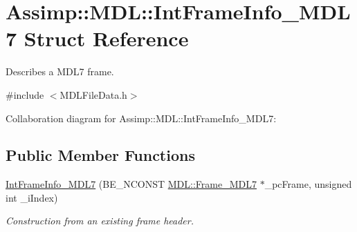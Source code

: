 \hypertarget{struct_assimp_1_1_m_d_l_1_1_int_frame_info___m_d_l7}{\section{Assimp\+:\+:M\+D\+L\+:\+:Int\+Frame\+Info\+\_\+\+M\+D\+L7 Struct Reference}
\label{struct_assimp_1_1_m_d_l_1_1_int_frame_info___m_d_l7}
}


Describes a M\+D\+L7 frame.  




{\ttfamily \#include $<$M\+D\+L\+File\+Data.\+h$>$}



Collaboration diagram for Assimp\+:\+:M\+D\+L\+:\+:Int\+Frame\+Info\+\_\+\+M\+D\+L7\+:
\subsection*{Public Member Functions}
\begin{DoxyCompactItemize}
\item 
\hypertarget{struct_assimp_1_1_m_d_l_1_1_int_frame_info___m_d_l7_a5e0211dcb0ba277f914e74333517ecfe}{\hyperlink{struct_assimp_1_1_m_d_l_1_1_int_frame_info___m_d_l7_a5e0211dcb0ba277f914e74333517ecfe}{Int\+Frame\+Info\+\_\+\+M\+D\+L7} (B\+E\+\_\+\+N\+C\+O\+N\+S\+T \hyperlink{struct_assimp_1_1_m_d_l_1_1_frame___m_d_l7}{M\+D\+L\+::\+Frame\+\_\+\+M\+D\+L7} $\ast$\+\_\+pc\+Frame, unsigned int \+\_\+i\+Index)}\label{struct_assimp_1_1_m_d_l_1_1_int_frame_info___m_d_l7_a5e0211dcb0ba277f914e74333517ecfe}

\begin{DoxyCompactList}\small\item\em Construction from an existing frame header. \end{DoxyCompactList}\end{DoxyCompactItemize}
